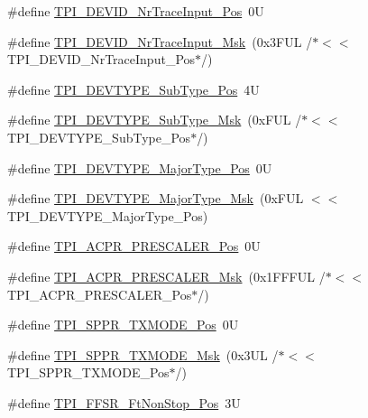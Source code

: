 \begin{DoxyCompactItemize}
\item 
\#define \hyperlink{group___c_m_s_i_s___t_p_i_ga80ecae7fec479e80e583f545996868ed}{T\+P\+I\+\_\+\+D\+E\+V\+I\+D\+\_\+\+Nr\+Trace\+Input\+\_\+\+Pos}~0U
\item 
\#define \hyperlink{group___c_m_s_i_s___t_p_i_gabed454418d2140043cd65ec899abd97f}{T\+P\+I\+\_\+\+D\+E\+V\+I\+D\+\_\+\+Nr\+Trace\+Input\+\_\+\+Msk}~(0x3\+F\+U\+L /$\ast$$<$$<$ T\+P\+I\+\_\+\+D\+E\+V\+I\+D\+\_\+\+Nr\+Trace\+Input\+\_\+\+Pos$\ast$/)
\item 
\#define \hyperlink{group___c_m_s_i_s___t_p_i_ga0c799ff892af5eb3162d152abc00af7a}{T\+P\+I\+\_\+\+D\+E\+V\+T\+Y\+P\+E\+\_\+\+Sub\+Type\+\_\+\+Pos}~4U
\item 
\#define \hyperlink{group___c_m_s_i_s___t_p_i_ga5b2fd7dddaf5f64855d9c0696acd65c1}{T\+P\+I\+\_\+\+D\+E\+V\+T\+Y\+P\+E\+\_\+\+Sub\+Type\+\_\+\+Msk}~(0x\+F\+U\+L /$\ast$$<$$<$ T\+P\+I\+\_\+\+D\+E\+V\+T\+Y\+P\+E\+\_\+\+Sub\+Type\+\_\+\+Pos$\ast$/)
\item 
\#define \hyperlink{group___c_m_s_i_s___t_p_i_ga69c4892d332755a9f64c1680497cebdd}{T\+P\+I\+\_\+\+D\+E\+V\+T\+Y\+P\+E\+\_\+\+Major\+Type\+\_\+\+Pos}~0U
\item 
\#define \hyperlink{group___c_m_s_i_s___t_p_i_gaecbceed6d08ec586403b37ad47b38c88}{T\+P\+I\+\_\+\+D\+E\+V\+T\+Y\+P\+E\+\_\+\+Major\+Type\+\_\+\+Msk}~(0x\+F\+U\+L $<$$<$ T\+P\+I\+\_\+\+D\+E\+V\+T\+Y\+P\+E\+\_\+\+Major\+Type\+\_\+\+Pos)
\item 
\#define \hyperlink{group___c_m_s_i_s___t_p_i_ga5a82d274eb2df8b0c92dd4ed63535928}{T\+P\+I\+\_\+\+A\+C\+P\+R\+\_\+\+P\+R\+E\+S\+C\+A\+L\+E\+R\+\_\+\+Pos}~0U
\item 
\#define \hyperlink{group___c_m_s_i_s___t_p_i_ga4fcacd27208419929921aec8457a8c13}{T\+P\+I\+\_\+\+A\+C\+P\+R\+\_\+\+P\+R\+E\+S\+C\+A\+L\+E\+R\+\_\+\+Msk}~(0x1\+F\+F\+F\+U\+L /$\ast$$<$$<$ T\+P\+I\+\_\+\+A\+C\+P\+R\+\_\+\+P\+R\+E\+S\+C\+A\+L\+E\+R\+\_\+\+Pos$\ast$/)
\item 
\#define \hyperlink{group___c_m_s_i_s___t_p_i_ga0f302797b94bb2da24052082ab630858}{T\+P\+I\+\_\+\+S\+P\+P\+R\+\_\+\+T\+X\+M\+O\+D\+E\+\_\+\+Pos}~0U
\item 
\#define \hyperlink{group___c_m_s_i_s___t_p_i_gaca085c8a954393d70dbd7240bb02cc1f}{T\+P\+I\+\_\+\+S\+P\+P\+R\+\_\+\+T\+X\+M\+O\+D\+E\+\_\+\+Msk}~(0x3\+U\+L /$\ast$$<$$<$ T\+P\+I\+\_\+\+S\+P\+P\+R\+\_\+\+T\+X\+M\+O\+D\+E\+\_\+\+Pos$\ast$/)
\item 
\#define \hyperlink{group___c_m_s_i_s___t_p_i_ga9537b8a660cc8803f57cbbee320b2fc8}{T\+P\+I\+\_\+\+F\+F\+S\+R\+\_\+\+Ft\+Non\+Stop\+\_\+\+Pos}~3U
$$
\end{DoxyCompactItemize}
